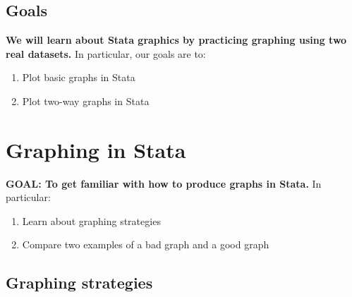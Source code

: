 \documentclass[
]{book}
\providecommand{\tightlist}{%
  \setlength{\itemsep}{0pt}\setlength{\parskip}{0pt}}
\begin{document}
\hypertarget{goals-8}{%
\subsection{Goals}\label{goals-8}}

\begin{alert}

\textbf{We will learn about Stata graphics by practicing graphing using two real datasets.} In particular, our goals are to:

\begin{enumerate}
\def\labelenumi{\arabic{enumi}.}
\tightlist
\item
  Plot basic graphs in Stata
\item
  Plot two-way graphs in Stata
\end{enumerate}

\end{alert}

\hypertarget{graphing-in-stata}{%
\section{Graphing in Stata}\label{graphing-in-stata}}

\begin{alert}

\textbf{GOAL: To get familiar with how to produce graphs in Stata.} In particular:

\begin{enumerate}
\def\labelenumi{\arabic{enumi}.}
\tightlist
\item
  Learn about graphing strategies
\item
  Compare two examples of a bad graph and a good graph
\end{enumerate}

\end{alert}

\hypertarget{graphing-strategies}{%
\subsection{Graphing strategies}\label{graphing-strategies}}
\end{document}
